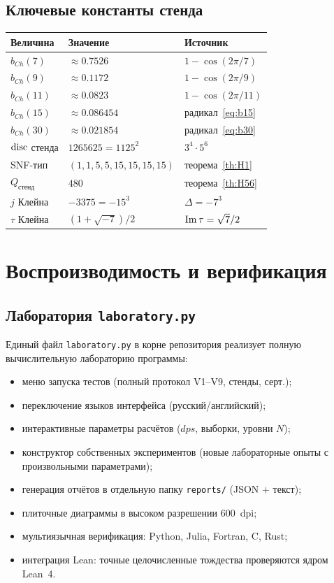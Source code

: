 \subsection{Ключевые константы стенда}

\begin{center}
\small
\begin{tabular}{@{}l l l@{}}
\toprule
Величина & Значение & Источник \\
\midrule
$b_{Ch}(7)$ & $\approx 0.7526$ & $1-\cos(2\pi/7)$ \\
$b_{Ch}(9)$ & $\approx 0.1172$ & $1-\cos(2\pi/9)$ \\
$b_{Ch}(11)$ & $\approx 0.0823$ & $1-\cos(2\pi/11)$ \\
$b_{Ch}(15)$ & $\approx 0.086454$ & радикал~\eqref{eq:b15} \\
$b_{Ch}(30)$ & $\approx 0.021854$ & радикал~\eqref{eq:b30} \\
$\operatorname{disc}$ стенда & $1265625=1125^2$ & $3^4\cdot5^6$ \\
SNF-тип & $(1,1,5,5,15,15,15,15)$ & теорема~\ref{th:H1} \\
$Q_{\text{стенд}}$ & $480$ & теорема~\ref{th:H56} \\
$j$ Клейна & $-3375=-15^3$ & $\Delta=-7^3$ \\
$\tau$ Клейна & $(1+\sqrt{-7})/2$ & $\operatorname{Im}\tau=\sqrt7/2$ \\
\bottomrule
\end{tabular}
\end{center}

\section{Воспроизводимость и верификация}\label{app:repro}

\subsection{Лаборатория \texttt{laboratory.py}}

Единый файл \texttt{laboratory.py} в корне репозитория реализует
полную вычислительную лабораторию программы:
\begin{itemize}[leftmargin=1.6em, itemsep=0.1em]
\item меню запуска тестов (полный протокол V1--V9, стенды, серт.);
\item переключение языков интерфейса (русский/английский);
\item интерактивные параметры расчётов ($dps$, выборки, уровни $N$);
\item конструктор собственных экспериментов (новые лабораторные
  опыты с произвольными параметрами);
\item генерация отчётов в отдельную папку \texttt{reports/} (JSON +
  текст);
\item плиточные диаграммы в высоком разрешении $600$~dpi;
\item мультиязычная верификация: Python, Julia, Fortran, C, Rust;
\item интеграция Lean: точные целочисленные тождества проверяются
  ядром Lean~4.
\end{itemize}


